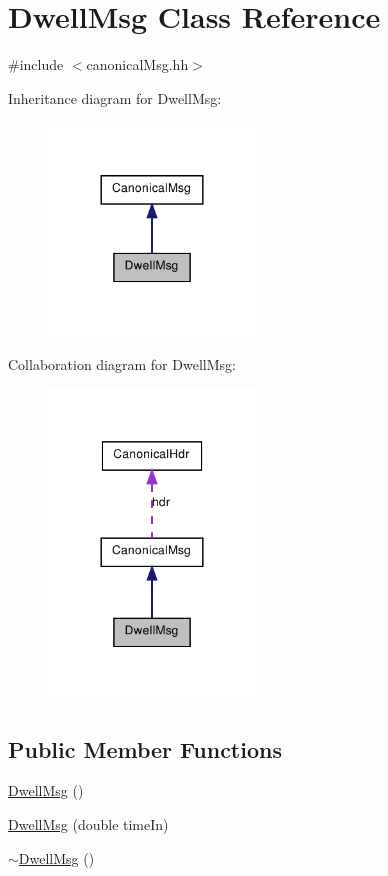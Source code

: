 \hypertarget{class_dwell_msg}{
\section{DwellMsg Class Reference}
\label{class_dwell_msg}
}


{\ttfamily \#include $<$canonicalMsg.hh$>$}



Inheritance diagram for DwellMsg:\nopagebreak
\begin{figure}[H]
\begin{center}
\leavevmode
\includegraphics[width=156pt]{class_dwell_msg__inherit__graph}
\end{center}
\end{figure}


Collaboration diagram for DwellMsg:\nopagebreak
\begin{figure}[H]
\begin{center}
\leavevmode
\includegraphics[width=156pt]{class_dwell_msg__coll__graph}
\end{center}
\end{figure}
\subsection*{Public Member Functions}
\begin{DoxyCompactItemize}
\item 
\hyperlink{class_dwell_msg_a7d71a7c93a9db45bf87678b006fc0fdb}{DwellMsg} ()
\item 
\hyperlink{class_dwell_msg_a76dbe2536d5abf593768e59d3b1bac9b}{DwellMsg} (double timeIn)
\item 
\hyperlink{class_dwell_msg_acce14108a4cf651e4c241ba906bf6bc1}{$\sim$DwellMsg} ()
\end{DoxyCompactItemize}
